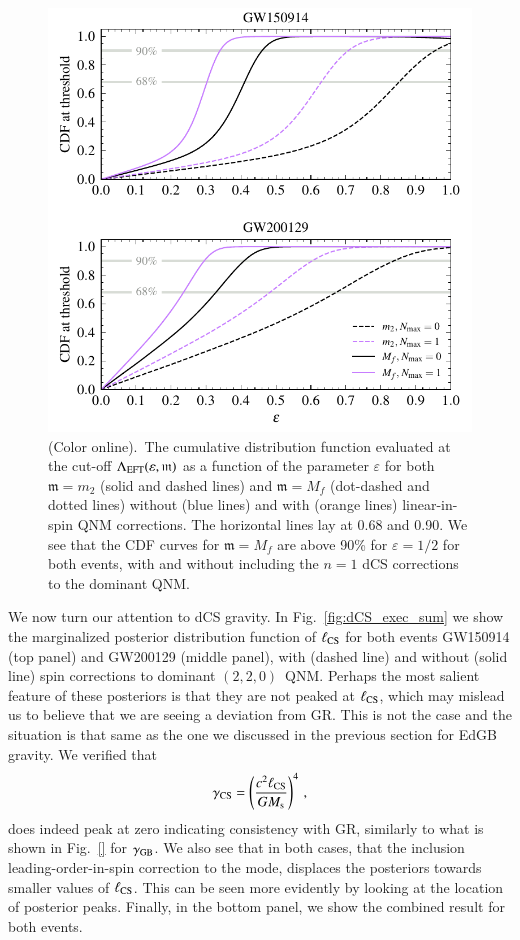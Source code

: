 \documentclass[twocolumn,
               prd,
               aps,
               superscriptaddress,
               tightenlines,
               nofootinbib,
               eqsecnum,
               amsfonts,
               amsmath,
               longbibliography]{revtex4-1}
\newcommand{\gm}{\mathfrak{m}}
\begin{document}
\begin{figure}[t]
\includegraphics[width=\columnwidth]{figs/dcs_cdf_varying_threshold.pdf}
\caption{(Color online).~The cumulative distribution function evaluated at the
cut-off $\Lambda_{\rm EFT}(\varepsilon, \gm)$ as a function of the parameter $\varepsilon$ for both
$\gm = m_2$ (solid and dashed lines) and $\gm = M_{f}$ (dot-dashed and dotted lines) without
(blue lines) and with (orange lines) linear-in-spin QNM corrections.
The horizontal lines lay at 0.68 and 0.90.
%
We see that the CDF curves for $\gm = M_{f}$ are above 90\% for $\varepsilon =
1/2$ for both events, with and without including the $n = 1$ dCS corrections to
the dominant QNM.
}
\label{fig:dcs_cdf}
\end{figure}

We now turn our attention to dCS gravity.
%
In Fig.~\ref{fig:dCS_exec_sum} we show the marginalized posterior distribution
function of $\ell_{\rm CS}$ for both events GW150914 (top panel) and GW200129
(middle panel), with (dashed line) and without (solid line) spin corrections to
dominant $(2,2,0)$~QNM.
%
Perhaps the most salient feature of these posteriors is that they are not
peaked at $\ell_{\rm CS}$, which may mislead us to believe that we are seeing a
deviation from GR. This is not the case and the situation is that same as the
one we discussed in the previous section for EdGB gravity.
%
We verified that
%
\begin{equation}
    \gamma_{\rm CS} = \left( \frac{c^2 \ell_{\rm CS}}{G M_{\rm s}} \right)^{4}\,,
\end{equation}
%
does indeed peak at zero indicating consistency with GR, similarly to what is shown in Fig.~\ref{} for $\gamma_{\rm GB}$.
%
We also see that in both cases, that the inclusion leading-order-in-spin
correction to the mode, displaces the posteriors towards smaller values of
$\ell_{\rm CS}$. This can be seen more evidently by looking at the location of
posterior peaks.
%
Finally, in the bottom panel, we show the combined result for both events.
\end{document}
